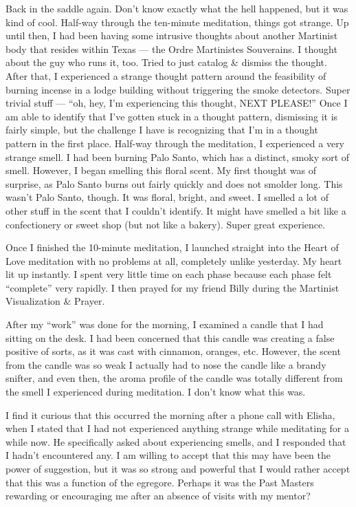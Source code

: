 \documentclass[b6paper]{article}
\begin{document}
Back in the saddle again. Don't know exactly what the hell happened, but it was kind of cool. Half-way through the ten-minute meditation, things got strange. Up until then, I had been having some intrusive thoughts about another Martinist body that resides within Texas --- the Ordre Martinistes Souverains. I thought about the guy who runs it, too. Tried to just catalog \& dismiss the thought. After that, I experienced a strange thought pattern around the feasibility of burning incense in a lodge building without triggering the smoke detectors. Super trivial stuff --- ``oh, hey, I'm experiencing this thought, NEXT PLEASE!'' Once I am able to identify that I've gotten stuck in a thought pattern, dismissing it is fairly simple, but the challenge I have is recognizing that I'm in a thought pattern in the first place. Half-way through the meditation, I experienced a very strange smell. I had been burning Palo Santo, which has a distinct, smoky sort of smell. However, I began smelling this floral scent. My first thought was of surprise, as Palo Santo burns out fairly quickly and does not smolder long. This wasn't Palo Santo, though. It was floral, bright, and sweet. I smelled a lot of other stuff in the scent that I couldn't identify. It might have smelled a bit like a confectionery or sweet shop (but not like a bakery). Super great experience. 

Once I finished the 10-minute meditation, I launched straight into the Heart of Love meditation with no problems at all, completely unlike yesterday. My heart lit up instantly. I spent very little time on each phase because each phase felt ``complete'' very rapidly. I then prayed for my friend Billy during the Martinist Visualization \& Prayer.

\pagebreak{}After my ``work'' was done for the morning, I examined a candle that I had sitting on the desk. I had been concerned that this candle was creating a false positive of sorts, as it was cast with cinnamon, oranges, etc. However, the scent from the candle was so weak I actually had to nose the candle like a brandy snifter, and even then, the aroma profile of the candle was totally different from the smell I experienced during meditation. I don't know what this was.

I find it curious that this occurred the morning after a phone call with Elisha, when I stated that I had not experienced anything strange while meditating for a while now. He specifically asked about experiencing smells, and I responded that I hadn't encountered any. I am willing to accept that this may have been the power of suggestion, but it was so strong and powerful that I would rather accept that this was a function of the egregore. Perhaps it was the Past Masters rewarding or encouraging me after an absence of visits with my mentor?
\end{document}
